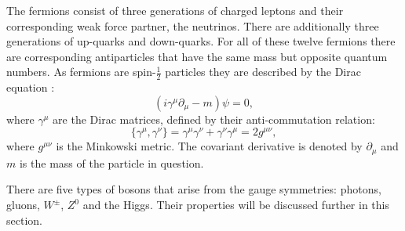 The fermions consist of three generations of charged leptons and their
corresponding weak force partner, the neutrinos. There are
additionally three generations of up-quarks and down-quarks. For all
of these twelve fermions there are corresponding antiparticles that
have the same mass but opposite quantum numbers. As fermions are
spin-$\frac{1}{2}$ particles they are described by the Dirac equation
\cite{Griffiths:111880}:
\begin{equation}
(i\gamma^{\mu}\partial_{\mu}-m)\psi=0,
\end{equation}
where $\gamma^{\mu}$ are the Dirac matrices, defined by their
anti-commutation relation:
\begin{equation}
\{\gamma^{\mu},\gamma^{\nu}\}=\gamma^{\mu}\gamma^{\nu}+\gamma^{\nu}\gamma^{\mu}=2g^{\mu\nu},
\end{equation}
where $g^{\mu\nu}$ is the Minkowski metric. The covariant derivative is denoted
by $\partial_{\mu}$ and $m$ is the mass of the particle in question.

There are five types of bosons that arise from the \SM gauge
symmetries: photons, gluons, $W^{\pm}$, $Z^0$ and the Higgs. Their
properties will be discussed further in this section.


